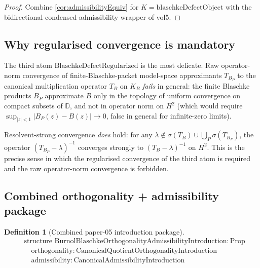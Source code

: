 \documentclass[12pt]{article}
\theoremstyle{definition}
\newtheorem{definition}[theorem]{Definition}
\theoremstyle{remark}
\newcommand{\BS}{B}
\newcommand{\KB}{K_{B}}
\newcommand{\D}{\mathbb{D}}
\begin{document}
\begin{proof}
Combine \cref{cor:admissibilityEquiv} for $K = \mathrm{blaschkeDefectObject}$ with the bidirectional condensed-admissibility wrapper of vol5.
\end{proof}

\subsection{Why regularised convergence is mandatory}\label{subsec:regularisedMandatory}

The third atom $\mathrm{BlaschkeDefectRegularized}$ is the most delicate. Raw operator-norm convergence of finite-Blaschke-packet model-space approximants $T_{B_{P}}$ to the canonical multiplication operator $T_{B}$ on $\KB$ \emph{fails} in general: the finite Blaschke products $\BS_{P}$ approximate $\BS$ only in the topology of uniform convergence on compact subsets of $\D$, and not in operator norm on $H^{2}$ (which would require $\sup_{|z|<1}|\BS_{P}(z) - \BS(z)| \to 0$, false in general for infinite-zero limits).

Resolvent-strong convergence \emph{does} hold: for any $\lambda \notin \sigma(T_{B}) \cup \bigcup_{P} \sigma(T_{B_{P}})$, the operator $(T_{B_{P}} - \lambda)^{-1}$ converges strongly to $(T_{B} - \lambda)^{-1}$ on $H^{2}$. This is the precise sense in which the regularised convergence of the third atom is required and the raw operator-norm convergence is forbidden.

\subsection{Combined orthogonality + admissibility package}\label{subsec:combined}

\begin{definition}[Combined paper-05 introduction package]\label{def:combinedPackage}
\begin{equation}\label{eq:combinedPackage}
\begin{aligned}
  &\text{structure } \mathrm{BurnolBlaschkeOrthogonalityAdmissibilityIntroduction} : \mathrm{Prop} \\
  &\quad \mathrm{orthogonality} : \mathrm{CanonicalQuotientOrthogonalityIntroduction} \\
  &\quad \mathrm{admissibility} : \mathrm{CanonicalAdmissibilityIntroduction}
\end{aligned}
\end{equation}
\end{definition}
\end{document}
